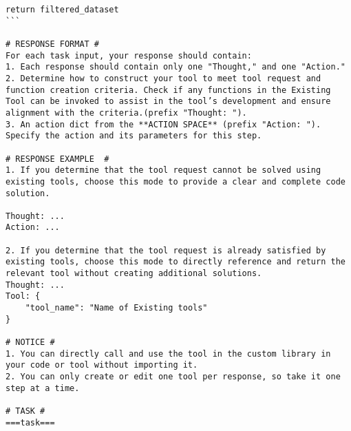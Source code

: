 \begin{tcolorbox}[title=Tool Manager's Prompt, breakable, width=\textwidth,top=0mm]
\begin{Verbatim}[breaklines, fontsize=\footnotesize]
    return filtered_dataset
```

# RESPONSE FORMAT #
For each task input, your response should contain:
1. Each response should contain only one "Thought," and one "Action."
2. Determine how to construct your tool to meet tool request and function creation criteria. Check if any functions in the Existing Tool can be invoked to assist in the tool’s development and ensure alignment with the criteria.(prefix "Thought: ").
3. An action dict from the **ACTION SPACE** (prefix "Action: "). Specify the action and its parameters for this step. 

# RESPONSE EXAMPLE  #
1. If you determine that the tool request cannot be solved using existing tools, choose this mode to provide a clear and complete code solution.

Thought: ...
Action: ...

2. If you determine that the tool request is already satisfied by existing tools, choose this mode to directly reference and return the relevant tool without creating additional solutions.
Thought: ...
Tool: {  
    "tool_name": "Name of Existing tools"
}

# NOTICE #
1. You can directly call and use the tool in the custom library in your code or tool without importing it.
2. You can only create or edit one tool per response, so take it one step at a time.

# TASK #
===task===
\end{Verbatim}
\end{tcolorbox}



